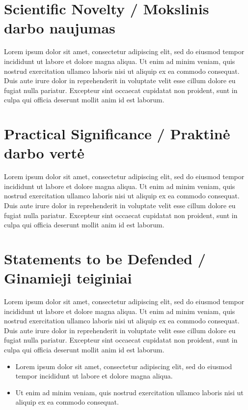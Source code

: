 \section*{Scientific Novelty / Mokslinis darbo naujumas} %

Lorem ipsum dolor sit amet, consectetur adipiscing elit, sed do eiusmod tempor incididunt ut labore et dolore magna aliqua. Ut enim ad minim veniam, quis nostrud exercitation ullamco laboris nisi ut aliquip ex ea commodo consequat. Duis aute irure dolor in reprehenderit in voluptate velit esse cillum dolore eu fugiat nulla pariatur. Excepteur sint occaecat cupidatat non proident, sunt in culpa qui officia deserunt mollit anim id est laborum.


\section*{Practical Significance / Praktinė darbo vertė}  %

Lorem ipsum dolor sit amet, consectetur adipiscing elit, sed do eiusmod tempor incididunt ut labore et dolore magna aliqua. Ut enim ad minim veniam, quis nostrud exercitation ullamco laboris nisi ut aliquip ex ea commodo consequat. Duis aute irure dolor in reprehenderit in voluptate velit esse cillum dolore eu fugiat nulla pariatur. Excepteur sint occaecat cupidatat non proident, sunt in culpa qui officia deserunt mollit anim id est laborum.


\section*{Statements to be Defended / Ginamieji teiginiai}

Lorem ipsum dolor sit amet, consectetur adipiscing elit, sed do eiusmod tempor incididunt ut labore et dolore magna aliqua. Ut enim ad minim veniam, quis nostrud exercitation ullamco laboris nisi ut aliquip ex ea commodo consequat. Duis aute irure dolor in reprehenderit in voluptate velit esse cillum dolore eu fugiat nulla pariatur. Excepteur sint occaecat cupidatat non proident, sunt in culpa qui officia deserunt mollit anim id est laborum.

\begin{itemize}
    \item Lorem ipsum dolor sit amet, consectetur adipiscing elit, sed do eiusmod tempor incididunt ut labore et dolore magna aliqua. 
    \item  Ut enim ad minim veniam, quis nostrud exercitation ullamco laboris nisi ut aliquip ex ea commodo consequat.
\end{itemize}

